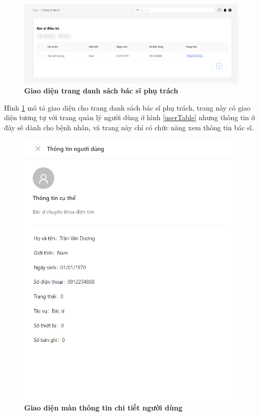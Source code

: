 \begin{figure}[H]
  \centering
  \includegraphics[scale=0.5]{Images/server/webUI/manageDoctor.png}
  \caption[Giao diện trang danh sách bác sĩ phụ trách]{\bfseries \fontsize{12pt}{0pt}\selectfont Giao diện trang danh sách bác sĩ phụ trách}
  \label{doctorTable} %
\end{figure}

Hình \ref{doctorTable} mô tả giao diện cho trang danh sách bác sĩ phụ trách, trang này có giao diện tương tự với trang 
quản lý người dùng ở hình \ref{userTable} nhưng thông tin ở đây sẽ dành cho bệnh nhân, và trang này chỉ có chức năng xem thông tin bác sĩ.

\begin{figure}[H]
  \centering
  \includegraphics[scale=0.6]{Images/server/webUI/userInfo.png}
  \caption[Giao diện màn thông tin chi tiết người dùng]{\bfseries \fontsize{12pt}{0pt}\selectfont Giao diện màn thông tin chi tiết người dùng}
  \label{userInfo} %
\end{figure}

